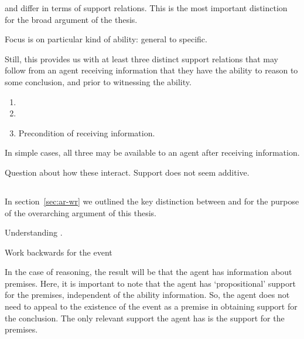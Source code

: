 \begin{note}
  \AR{} and \WR{} differ in terms of support relations.
  This is the most important distinction for the broad argument of the thesis.

  Focus is on particular kind of ability: general to specific.

  Still, this provides us with at least three distinct support relations that may follow from an agent receiving information that they have the ability to reason to some conclusion, and prior to witnessing the ability.
  \begin{enumerate}
  \item \AR{}
  \item \WR{}
  \item Precondition of receiving information.
  \end{enumerate}
  In simple cases, all three may be available to an agent after receiving information.

  Question about how these interact.
  Support does not seem additive.
  
\end{note}

\subsection{\AR{}}
\label{sec:ar}



\subsection{\WR{}}
\label{sec:wr}

\begin{note}[Overview]
  In section~\ref{sec:ar-wr} we outlined the key distinction between \AR{} and \WR{} for the purpose of the overarching argument of this thesis.
  
  

  Understanding \WR{}.
\end{note}

\begin{note}
  Work backwards for the event
\end{note}

\begin{note}
  In the case of reasoning, the result will be that the agent has information about premises.
  Here, it is important to note that the agent has `propositional' support for the premises, independent of the ability information.
  So, the agent does not need to appeal to the existence of the event as a premise in obtaining support for the conclusion.
  The only relevant support the agent has is the support for the premises.
\end{note}

